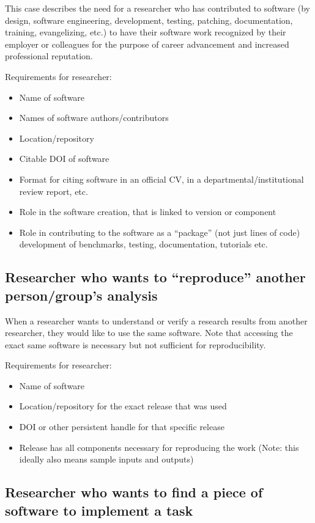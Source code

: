 \documentclass[12pt, oneside]{amsart}
\begin{document}
This case describes the need for a researcher who has contributed to software (by design, software engineering, development, testing, patching, documentation, training, evangelizing, etc.)
to have their software work recognized by their employer or colleagues for the purpose of career advancement and increased professional reputation.

Requirements for researcher:
\begin{itemize}
\item Name of software
\item Names of software authors/contributors
\item Location/repository
\item Citable DOI of software
\item Format for citing software in an official CV, in a departmental/institutional review report, etc.
\item Role in the software creation, that is linked to version or component
\item Role in contributing to the software as a ``package'' (not just lines of code) development of benchmarks, testing, documentation, tutorials etc.
\end{itemize}

\subsection{Researcher who wants to ``reproduce'' another person\slash group's analysis}

When a researcher wants to understand or verify a research results from another researcher, they
would like to use the same software.  Note that accessing the exact same software is necessary but not sufficient for reproducibility.

Requirements for researcher:
\begin{itemize}
\item Name of software
\item Location/repository for the exact release that was used
\item DOI or other persistent handle for that specific release
\item Release has all components necessary for reproducing the work (Note: this ideally also means sample inputs and outputs)
\end{itemize}

\subsection{Researcher who wants to find a piece of software to implement a task}
\end{document}
